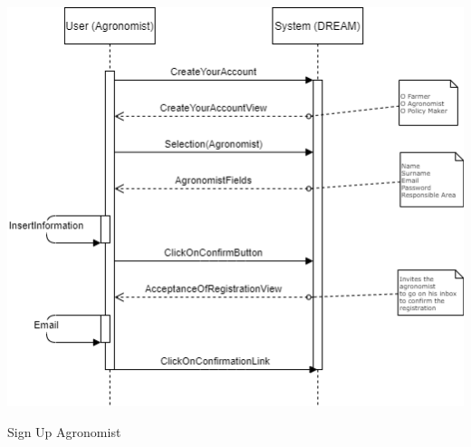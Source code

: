 \documentclass{article}
\begin{document}
\begin{center}
    
    \includegraphics[width=1.0\textwidth]{images/sequenceDiagrams/13. SignUpAgronomist.png}
    \par
    \caption{\label{fig:frog}Sign Up Agronomist}

    \newpage
    
    
    
    
    
    
    
    
    

\end{center}
\end{document}
